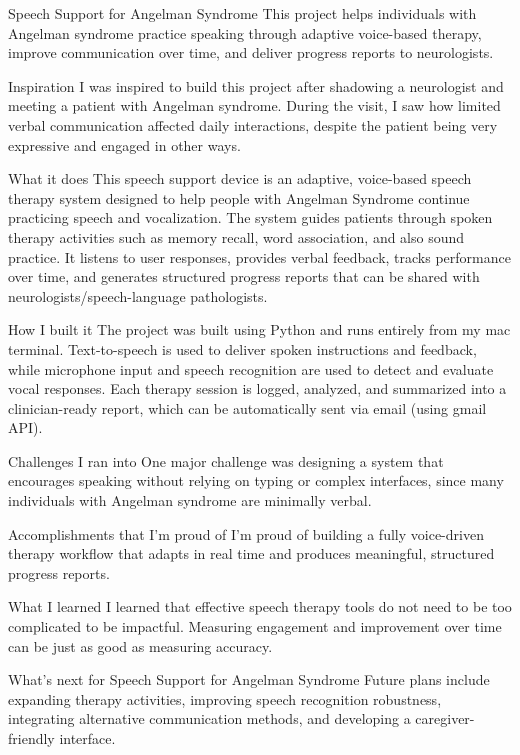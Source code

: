 Speech Support for Angelman Syndrome
This project helps individuals with Angelman syndrome practice speaking through adaptive voice-based therapy, improve communication over time, and deliver progress reports to neurologists.

Inspiration
I was inspired to build this project after shadowing a neurologist and meeting a patient with Angelman syndrome. During the visit, I saw how limited verbal communication affected daily interactions, despite the patient being very expressive and engaged in other ways.

What it does
This speech support device is an adaptive, voice-based speech therapy system designed to help people with Angelman Syndrome continue practicing speech and vocalization. The system guides patients through spoken therapy activities such as memory recall, word association, and also sound practice. It listens to user responses, provides verbal feedback, tracks performance over time, and generates structured progress reports that can be shared with neurologists/speech-language pathologists.

How I built it
The project was built using Python and runs entirely from my mac terminal. Text-to-speech is used to deliver spoken instructions and feedback, while microphone input and speech recognition are used to detect and evaluate vocal responses. Each therapy session is logged, analyzed, and summarized into a clinician-ready report, which can be automatically sent via email (using gmail API).

Challenges I ran into
One major challenge was designing a system that encourages speaking without relying on typing or complex interfaces, since many individuals with Angelman syndrome are minimally verbal.

Accomplishments that I'm proud of
I'm proud of building a fully voice-driven therapy workflow that adapts in real time and produces meaningful, structured progress reports.

What I learned
I learned that effective speech therapy tools do not need to be too complicated to be impactful. Measuring engagement and improvement over time can be just as good as measuring accuracy.

What's next for Speech Support for Angelman Syndrome
Future plans include expanding therapy activities, improving speech recognition robustness, integrating alternative communication methods, and developing a caregiver-friendly interface.
